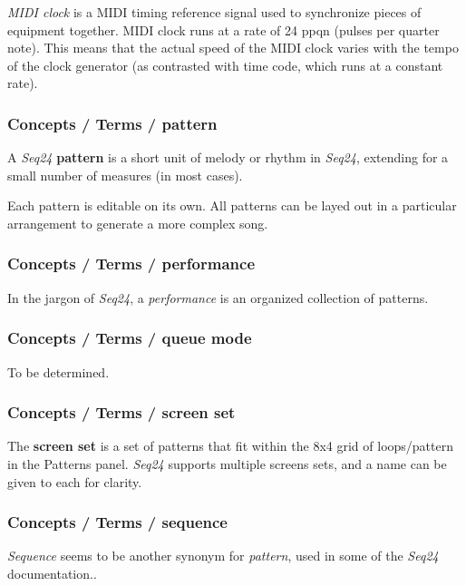    \textsl{MIDI clock} is
   a MIDI timing reference signal used to synchronize pieces of equipment
   together. MIDI clock runs at a rate of 24 ppqn (pulses per quarter note).
   This means that the actual speed of the MIDI clock varies with the tempo
   of the clock generator (as contrasted with time code, which runs at a
   constant rate).

\subsubsection{Concepts / Terms / pattern}
\label{subsubsec:concepts_terms_pattern}

   A \textsl{Seq24} \textbf{pattern}
   is a short unit of melody or rhythm in \textsl{Seq24},
   extending for a small number of measures (in most cases).

   Each pattern is editable on its own.  All patterns can be layed out in
   a particular arrangement to generate a more complex song.

\subsubsection{Concepts / Terms / performance}
\label{subsubsec:concepts_terms_performance}

   In the jargon of \textsl{Seq24}, a
   \textsl{performance} is an organized collection of patterns.

\subsubsection{Concepts / Terms / queue mode}
\label{subsubsec:concepts_terms_queue_mode}

   To be determined.

\subsubsection{Concepts / Terms / screen set}
\label{subsubsec:concepts_terms_screen_set}

   The \textbf{screen set}
   is a set of patterns that fit within the 8x4 grid of loops/pattern in the
   Patterns panel.
   \textsl{Seq24} supports multiple screens sets, and a name can be given to
   each for clarity.

\subsubsection{Concepts / Terms / sequence}
\label{subsubsec:concepts_terms_sequence}

   \textsl{Sequence} seems to be
   another synonym for \textsl{pattern}, used in some of the \textsl{Seq24}
   documentation..


